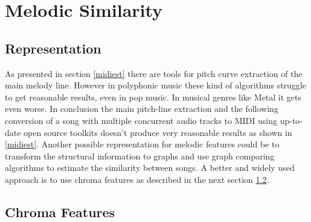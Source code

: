 \newpage

\section{Melodic Similarity}\label{melsimc}

\subsection{Representation}

As presented in section \ref{midiest} there are tools for pitch curve extraction of the main melody line. However in polyphonic music these kind of algorithms struggle to get reasonable results, even in pop music. In musical genres like Metal it gets even worse. In conclusion the main pitch-line extraction and the following conversion of a song with multiple concurrent audio tracks to MIDI using up-to-date open source toolkits doesn't produce very reasonable results as shown in \ref{midiest}.
Another possible representation for melodic features could be to transform the structural information to graphs and use graph comparing algorithms to estimate the similarity between songs. \cite{graph1} 
A better and widely used approach is to use chroma features as described in the next section \ref{chromafeat}.

\subsection{Chroma Features}\label{chromafeat}

